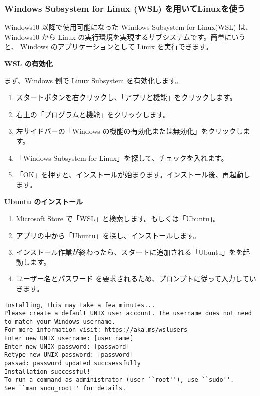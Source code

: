 \documentclass[10pt,a4j]{jarticle}
\begin{document}
\subsubsection{Windows Subsystem for Linux (WSL) を用いてLinuxを使う}
Windows10 以降で使用可能になった Windows Subsystem for Linux(WSL) は、 Windows10 から Linux の実行環境を実現するサブシステムです。簡単にいうと、 Windows のアプリケーションとして Linux を実行できます。

\vspace{1cm}
{\large \bf WSL の有効化}
\vspace{0.5cm}

まず、Windows 側で Linux Subsystem を有効化します。
\begin{enumerate}
\item スタートボタンを右クリックし、「アプリと機能」をクリックします。
\item 右上の「プログラムと機能」をクリックします。
\item 左サイドバーの「Windows の機能の有効化または無効化」をクリックします。
\item 「Windows Subsystem for Linux」を探して、チェックを入れます。
\item 「OK」を押すと、インストールが始まります。インストール後、再起動します。
\end{enumerate}

\vspace{1cm}
{\large \bf Ubuntu のインストール}
\vspace{0.5cm}

\begin{enumerate}
\item Microsoft Store で「WSL」と検索します。もしくは「Ubuntu」。
\item アプリの中から「Ubuntu」を探し、インストールします。
\item インストール作業が終わったら、スタートに追加される「Ubuntu」をを起動します。
\item ユーザー名とパスワード を要求されるため、プロンプトに従って入力していきます。
\end{enumerate}
\begin{lstlisting}[caption=表示されるスクリプト例]
Installing, this may take a few minutes...
Please create a default UNIX user account. The username does not need to match your Windows username.
For more information visit: https://aka.ms/wslusers
Enter new UNIX username: [user name]
Enter new UNIX password: [password]
Retype new UNIX password: [password]
passwd: password updated succsessfully
Installation successful!
To run a command as administrator (user ``root''), use ``sudo''.
See ``man sudo_root'' for details.
\end{lstlisting}
\end{document}
